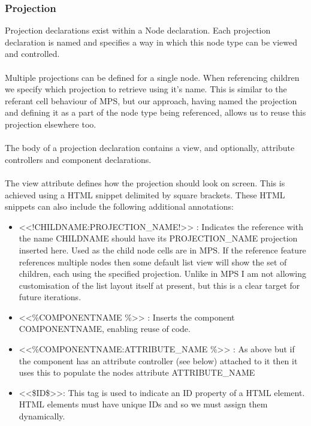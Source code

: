 \documentclass{article}
\begin{document}
{\subsubsection{Projection}
Projection declarations exist within a Node declaration. Each projection declaration is named and specifies a way in which this node type can be viewed and controlled.
\\
\\
Multiple projections can be defined for a single node. When referencing children we specify which projection to retrieve using it's name. This is similar to the referant cell behaviour of MPS, but our approach, having named the projection and defining it as a part of the node type being referenced, allows us to reuse this projection elsewhere too.
\\
\\
The body of a projection declaration contains a view, and optionally, attribute controllers and component declarations.
\\
\\
The view attribute defines how the projection should look on screen. This is achieved using a HTML snippet delimited by square brackets.  These HTML snippets can also include the following additional annotations:
\begin{itemize}
\item <<!CHILDNAME:PROJECTION\_NAME!>> : Indicates the reference with the name CHILDNAME should have its PROJECTION\_NAME projection inserted here. Used as the child node cells are in MPS. If the reference feature references multiple nodes then some default list view will show the set of children, each using the specified projection. Unlike in MPS I am not allowing customisation of the list layout itself at present, but this is a clear target for future iterations.
\item <<\%COMPONENTNAME \%>> : Inserts the component COMPONENTNAME, enabling reuse of code.
\item <<\%COMPONENTNAME:ATTRIBUTE\_NAME \%>> : As above but if the component has an attribute controller (see below) attached to it then it uses this to populate the nodes attribute ATTRIBUTE\_NAME
\item <<\$ID\$>>: This tag is used to indicate an ID property of a HTML element. HTML elements must have unique IDs and so we must assign them dynamically.
\end{itemize}

}
\end{document}
